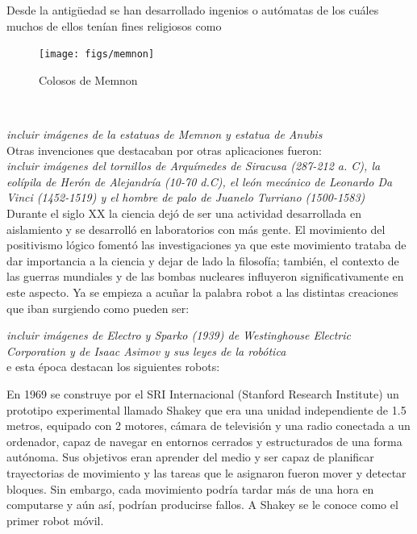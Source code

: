 Desde la antigüedad se han desarrollado ingenios o autómatas de los cuáles muchos de ellos tenían fines religiosos como \\


\begin{figure} [h!]
	\begin{center}
		\texttt{[image: figs/memnon]}
	\end{center}
	\caption{Colosos de Memnon \cite{memnon_image}}
	\label{fig:memnon}
\end{figure}\

 \textit{incluir imágenes de la estatuas de Memnon \cite{memnon_image} y estatua de Anubis}\\
 
Otras invenciones que destacaban por otras aplicaciones fueron: \\

 \textit{incluir imágenes del tornillos de Arquímedes de Siracusa (287-212 a. C), la eolípila de Herón de Alejandría (10-70 d.C), el león mecánico de Leonardo Da Vinci (1452-1519) y el hombre de palo de Juanelo Turriano (1500-1583) }\\

Durante el siglo XX la ciencia dejó de ser una actividad desarrollada en aislamiento y se desarrolló en laboratorios con más gente. El movimiento del positivismo lógico fomentó las investigaciones ya que este movimiento trataba de dar importancia a la ciencia y dejar de lado la filosofía; también, el contexto de las guerras mundiales y de las bombas nucleares influyeron significativamente en este aspecto. Ya se empieza a acuñar la palabra robot a las distintas creaciones que iban surgiendo como pueden ser:

 \textit{incluir imágenes de  Electro y Sparko (1939) de Westinghouse Electric Corporation y de Isaac Asimov y sus leyes de la robótica }\\


e esta época destacan los siguientes robots: 

En 1969 se construye por el SRI Internacional (Stanford Research Institute) un prototipo experimental llamado Shakey que era una unidad independiente de 1.5 metros, equipado con 2 motores, cámara de televisión y una radio conectada a un ordenador, capaz de navegar en entornos cerrados y estructurados de una forma autónoma. Sus objetivos eran aprender del medio y ser capaz de planificar trayectorias de movimiento y las tareas que le asignaron fueron mover y detectar bloques. Sin embargo, cada movimiento podría tardar más de una hora en computarse y aún así, podrían producirse fallos. A Shakey se le conoce como el primer robot móvil. 

